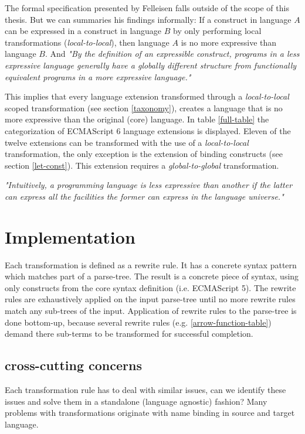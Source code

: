 The formal specification presented by Felleisen falls outside of the scope of this thesis. But we can summaries his findings informally: If a construct in language $A$ can be expressed in a construct in language $B$ by only performing local transformations (\textit{local-to-local}), then language $A$ is no more expressive than language $B$. And \textit{"By the definition of an expressible construct, programs in a less expressive language generally have a globally different structure from functionally equivalent programs in a more expressive language."}\cite{Felleisen1990} 

This implies that every language extension transformed through a \textit{local-to-local} scoped transformation (see section \ref{taxonomy}), creates a language that is no more expressive than the original (core) language. In table \ref{full-table} the categorization of ECMAScript 6 language extensions is displayed. Eleven of the twelve extensions can be transformed with the use of a \textit{local-to-local} transformation, the only exception is the extension of binding constructs (see section \ref{let-const}). This extension requires a \textit{global-to-global} transformation. 

\textit{"Intuitively, a programming language is less expressive than another if the latter can express all the facilities the former can express in the language universe."}\cite{Felleisen1990}


\section{Implementation}
Each transformation is defined as a rewrite rule. It has a concrete syntax pattern which matches part of a parse-tree. The result is a concrete piece of syntax, using only constructs from the core syntax definition (i.e. ECMAScript 5).
The rewrite rules are exhaustively applied on the input parse-tree until no more rewrite rules match any sub-trees of the input. Application of rewrite rules to the parse-tree is done bottom-up, because several rewrite rules (e.g. \ref{arrow-function-table}) demand there sub-terms to be transformed for successful completion.

\subsection{cross-cutting concerns}
Each transformation rule has to deal with similar issues, can we identify these issues and solve them in a standalone (language agnostic) fashion?
Many problems with transformations originate with name binding in source and target language.

